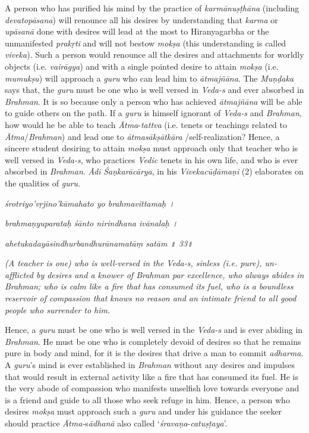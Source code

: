 A person who has purified his mind by the practice of \emph{karmānuṣṭhāna} (including \emph{devatopāsana}) will renounce all his desires by understanding that \emph{karma} or \emph{upāsanā} done with desires will lead at the most to Hiranyagarbha or the unmanifested \emph{prakṛti} and will not bestow \emph{mokṣa} (this understanding is called \emph{viveka}). Such a person would renounce all the desires and attachments for worldly objects (i.e. \emph{vairāgya}) and with a single pointed desire to attain \emph{mokṣa} (i.e. \emph{mumukṣu}) will approach a \emph{guru} who can lead him to \emph{ātmajñāna}. The \emph{Muṇḍaka} says that, the \emph{guru} must be one who is well versed in \emph{Veda-s} and ever absorbed in \emph{Brahman}. It is so because only a person who has achieved \emph{ātmajñāna} will be able to guide others on the path. If a \emph{guru} is himself ignorant of \emph{Veda-s} and \emph{Brahman}, how would he be able to teach \emph{Ātma}-\emph{tattva} (i.e. tenets or teachings related to \emph{Ātma}/\emph{Brahman}) and lead one to \emph{ātmasākṣātkāra} /self-realization? Hence, a sincere student desiring to attain \emph{mokṣa} must approach only that teacher who is well versed in \emph{Veda-s}, who practices \emph{Vedic} tenets in his own life, and who is ever absorbed in \emph{Brahman}. \emph{Ādi} \emph{Śaṇkarācārya}, in his \emph{Vivekacūḍāmaṇi} (2) elaborates on the qualities of \emph{guru}.

\emph{śrotriyo'vṛjino'kāmahato yo brahmavittamaḥ ।}

\emph{brahmaṇyuparataḥ śānto nirindhana ivānalaḥ ।}

\emph{ahetukadayāsindhurbandhurānamatāṃ satām ॥ 33॥ }

\emph{(A teacher is one) who is well-versed in the Veda-s, sinless (i.e. pure), un-afflicted by desires and a knower of Brahman par excellence, who always abides in Brahman; who is calm like a fire that has consumed its fuel, who is a boundless reservoir of compassion that knows no reason and an intimate friend to all good people who surrender to him.}

Hence, a \emph{guru} must be one who is well versed in the \emph{Veda-s} and is ever abiding in \emph{Brahman}. He must be one who is completely devoid of desires so that he remains pure in body and mind, for it is the desires that drive a man to commit \emph{adharma}. A \emph{guru}'s mind is ever established in \emph{Brahman} without any desires and impulses that would result in external activity like a fire that has consumed its fuel. He is the very abode of compassion who manifests unselfish love towards everyone and is a friend and guide to all those who seek refuge in him. Hence, a person who desires \emph{mokṣa} must approach such a \emph{guru} and under his guidance the seeker should practice \emph{Ātma-}s\emph{ādhanā} also called `\emph{śravaṇa}-\emph{catuṣṭaya}'.

